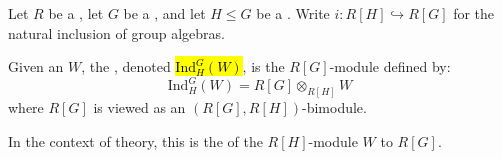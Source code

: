 \begin{definition} \label{definition:induction_of_a_group_module_over_a_ring_to_a_supergroup}
    Let $R$ be a , let $G$ be a , and let $H \leq G$ be a . Write $i: R[H] \hookrightarrow R[G]$ for the natural inclusion of group algebras.

    Given an  $W$, the , denoted \hl{$\text{Ind}^G_H(W)$}, is the $R[G]$-module defined by:
    $$\text{Ind}^G_H(W) = R[G] \otimes_{R[H]} W$$
    where $R[G]$ is viewed as an $(R[G], R[H])$-bimodule.

    In the context of  theory, this is the  of the $R[H]$-module $W$ to $R[G]$.
\end{definition}
